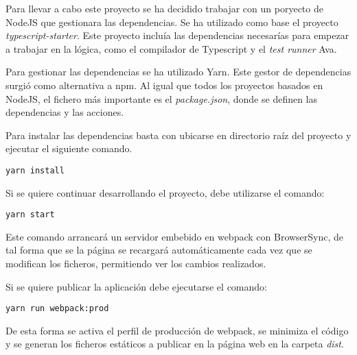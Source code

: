 Para llevar a cabo este proyecto se ha decidido trabajar con un poryecto de NodeJS que gestionara
las dependencias. Se ha utilizado como base el proyecto \textit{typescript-starter}.\cite{TypescriptStarter}
Este proyecto incluía las dependencias necesarías para empezar a trabajar en la lógica, como 
el compilador de Typescript y el \textit{test runner} Ava.

\bigskip
Para gestionar las dependencias se ha utilizado Yarn\cite{yarn}. Este gestor de dependencias surgió
como alternativa a npm\cite{npm}. Al igual que todos los proyectos basados en NodeJS, el fichero
más importante es el \textit{package.json}, donde se definen las dependencias y las acciones.

\bigskip
Para instalar las dependencias basta con ubicarse en directorio raíz del proyecto y ejecutar el siguiente
comando.

\begin{lstlisting}
yarn install
\end{lstlisting}

\bigskip
Si se quiere continuar desarrollando el proyecto, debe utilizarse el comando: 
\begin{lstlisting}
yarn start
\end{lstlisting}

Este comando arrancará un servidor embebido en webpack con BrowserSync, de tal forma que se la 
página se recargará automáticamente cada vez que se modifican los ficheros, 
permitiendo ver los cambios realizados.

\bigskip
Si se quiere publicar la aplicación debe ejecutarse el comando:
\begin{lstlisting}
yarn run webpack:prod
\end{lstlisting}

De esta forma se activa el perfil de producción de webpack, se minimiza el código y se generan 
los ficheros estáticos a publicar en la página web en la carpeta \textit{dist}.
